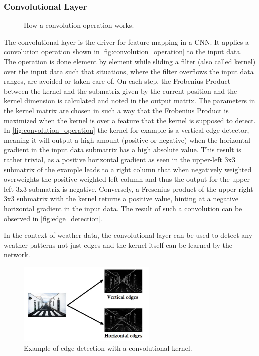 \subsubsection*{Convolutional Layer}
\begin{figure}
    \centering
    \caption{How a convolution operation works. \cite{datahacker}}
    \label{fig:convolution_operation}
\end{figure}

The convolutional layer is the driver for feature mapping in a CNN. It applies a convolution operation shown in \autoref{fig:convolution_operation} to the input data. The operation is done element by element while sliding a filter (also called kernel) over the input data such that situations, where the filter overflows the input data ranges, are avoided or taken care of. On each step, the Frobenius Product between the kernel and the submatrix given by the current position and the kernel dimension is calculated and noted in the output matrix. The parameters in the kernel matrix are chosen in such a way that the Frobenius Product is maximized when the kernel is over a feature that the kernel is supposed to detect. In \autoref{fig:convolution_operation} the kernel for example is a vertical edge detector, meaning it will output a high amount (positive or negative) when the horizontal gradient in the input data submatrix has a high absolute value. This result is rather trivial, as a positive horizontal gradient as seen in the upper-left 3x3 submatrix of the example leads to a right column that when negatively weighted overweights the positive-weighted left column and thus the output for the upper-left 3x3 submatrix is negative. Conversely, a Fresenius product of the upper-right 3x3 submatrix with the kernel returns a positive value, hinting at a negative horizontal gradient in the input data. The result of such a convolution can be observed in \autoref{fig:edge_detection}.

In the context of weather data, the convolutional layer can be used to detect any weather patterns not just edges and the kernel itself can be learned by the network.

\begin{figure}
    \centering
    \includegraphics[width=250px]{resources/images/edge_detection.jpeg}
    \caption{Example of edge detection with a convolutional kernel. \cite{datahacker}}
    \label{fig:edge_detection}
\end{figure}

